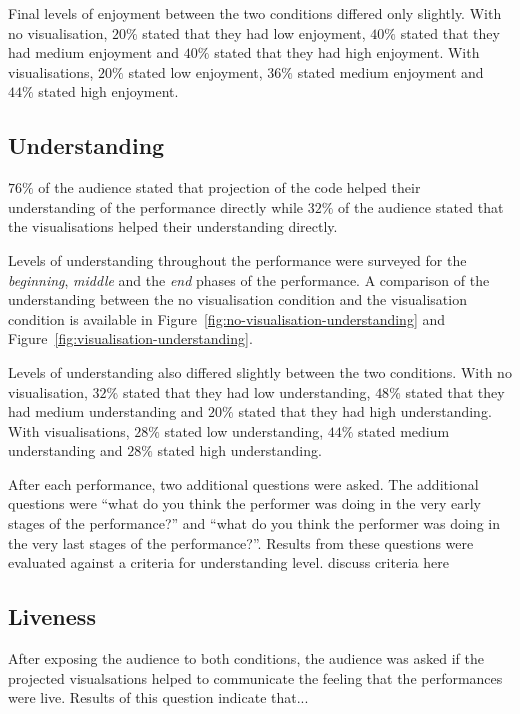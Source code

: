 Final levels of enjoyment between the two conditions differed only slightly. With no visualisation, $20\%$ stated that they had low enjoyment, $40\%$ stated that they had medium enjoyment and $40\%$ stated that they had high enjoyment. With visualisations, $20\%$ stated low enjoyment, $36\%$ stated medium enjoyment and $44\%$ stated high enjoyment.

\subsection{Understanding}



$76\%$ of the audience stated that projection of the code helped their understanding of the performance directly while $32\%$ of the audience stated that the visualisations helped their understanding directly.

Levels of understanding throughout the performance were surveyed for the \emph{beginning}, \emph{middle} and the \emph{end} phases of the performance. A comparison of the understanding between the no visualisation condition and the visualisation condition is available in Figure~\ref{fig:no-visualisation-understanding} and Figure~\ref{fig:visualisation-understanding}.

Levels of understanding also differed slightly between the two conditions. With no visualisation, $32\%$ stated that they had low understanding, $48\%$ stated that they had medium understanding and $20\%$ stated that they had high understanding. With visualisations, $28\%$ stated low understanding, $44\%$ stated medium understanding and $28\%$ stated high understanding.

After each performance, two additional questions were asked. The additional questions were ``what do you think the performer was doing in the very early stages of the performance?'' and ``what do you think the performer was doing in the very last stages of the performance?''. Results from these questions were evaluated against a criteria for understanding level. {\color{red} discuss criteria here}

\subsection{Liveness}

After exposing the audience to both conditions, the audience was asked if the projected visualsations helped to communicate the feeling that the performances were live. Results of this question indicate that...

